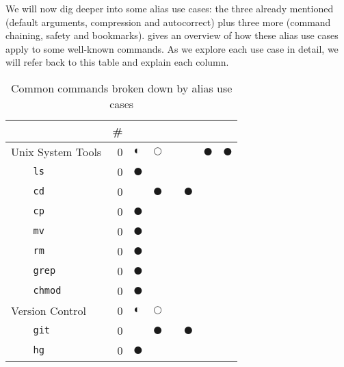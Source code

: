 We will now dig deeper into some alias use cases: the three already mentioned (default arguments, compression and autocorrect) plus three more (command chaining, safety and bookmarks).
 gives an overview of how these alias use cases apply to some well-known commands.
As we explore each use case in detail, we will refer back to this table and explain each column.

\newcommand{\rot}[1]{\makebox[1em][l]{\rotatebox{45}{#1}}}

\newcommand{\yes}{$\CIRCLE$}
\newcommand{\no}{}
\newcommand{\some}{$\Circle$}
\newcommand{\many}{$\LEFTcircle$}

\begin{table*}
    \caption{Common commands broken down by alias use cases}
    \label{tab:use-cases}
    \begin{tabular}{llrllllll}
        & & \# & \rot{Default Arguments} & \rot{Autocorrect} & \rot{Compression} & \rot{Chaining} & \rot{Safety} & \rot{Bookmarks} \\
        \midrule
        \multicolumn{2}{l}{Unix System Tools}           & \num{0} & \many & \some & \no &       & \yes & \yes \\
            & \texttt{ls}                               & \num{0}    & \yes  &       &     &      &  & \\
            & \texttt{cd}                               & \num{0}    &       & \yes  &     & \yes & & \\
            & \texttt{cp}                               & \num{0}    & \yes  &       &     &      & & \\
            & \texttt{mv}                               & \num{0}    & \yes  &       &     &      & & \\
            & \texttt{rm}                               & \num{0}    & \yes  &       &     &      & & \\
            & \texttt{grep}                             & \num{0}    & \yes  &       &     &      & & \\
            & \texttt{chmod}                            & \num{0}    & \yes  &       &     &      & & \\
        \midrule
        \multicolumn{2}{l}{Version Control}             & \num{0} & \many & \some & \no &       & & \\
            & \texttt{git}                              & \num{0}    &       & \yes  &     & \yes  & & \\
            & \texttt{hg}                               & \num{0}    & \yes  &       &     &       & & \\

\end{tabular}
\end{table*}
